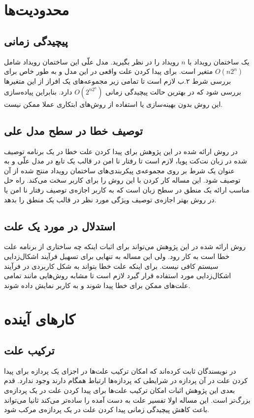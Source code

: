 \documentclass[
msc,
irfonts
]{./tex/tehran-thesis}
\newcommand{\پ}{پروژه/پایان‌نامه/رساله }
\theoremstyle{definition}
\theoremstyle{theorem}
\theoremstyle{definition}
\numberwithin{algorithm}{chapter}
\begin{document}
\section{محدودیت‌ها}
\subsection{پیچیدگی زمانی}
یک ساختمان رویداد با 
$n$
رویداد را در نظر بگیرید.
مدل علّی این ساختمان رویداد شامل 
$O(n2^n)$
متغیر است.
برای پیدا کردن علت واقعی در این مدل و به طور خاص برای بررسی شرط ۲.ب لازم است تا تمامی زیر مجموعه‌های یک افراز از این متغیر‌ها بررسی شود که در بهترین حالت پیچیدگی زمانی
$O(2^{n2^n})$
دارد.
بنابراین پیاده‌سازی این روش بدون بهینه‌سازی یا استفاده از روش‌های ابتکاری عملا ممکن نیست.
\subsection{توصیف خطا در سطح مدل علی}
در روش ارائه شده در این پژوهش برای پیدا کردن علت خطا در یک برنامه توصیف شده در زبان نت‌کت پویا، لازم است تا رفتار نا امن در قالب یک تابع در مدل علّی و به عنوان یک شرط بر روی مجموعه‌ی پیکربندی‌های ساختمان رویداد منتج شده از‌ آن توصیف شود.
این مساله کار کردن با این روش را برای کاربر سخت می‌کند. 
راه حل مناسب ارائه یک منطق در سطح زبان است که به کاربر اجازه‌ی توصیف رفتار نا امن یا در روش بهتر اجازه‌ی توصیف ویژگی مورد نظر در قالب یک منطق را بدهد.

\subsection{استدلال در مورد یک علت}
روش ارائه شده در این پژوهش می‌تواند برای اثبات اینکه چه ساختاری از برنامه علت خطا است به کار رود. 
ولی این مساله به تنهایی برای تسهیل فرآیند اشکال‌زدایی سیستم کافی نیست.
برای اینکه علت خطا بتواند به شکل کاربردی در فرآیند اشکال‌زدایی مورد استفاده قرار گیرد لازم است تا مشابه روش‌هایی مانند
\cite{chockler}
تمامی علت‌های ممکن برای خطا پیدا شوند و به کاربر نمایش داده شوند.

\section{کار‌های آینده}

\subsection{ترکیب علت}
در 
\cite{causal-hml}
نویسندگان ثابت کرده‌اند که امکان ترکیب علت‌ها در اجزای یک پردازه برای پیدا کردن علت در آن پردازه در شرایطی که پردازه‌ها ارتباط  
همگام دارند وجود ندارد.
قدم بعدی این پژوهش اثبات امکان ترکیب علت‌ها برای پیدا کردن علت در یک پردازه‌ی بزرگ‌تر است.
این مساله اولا تفسیر علت به دست آمده را ساده‌تر می‌کند ثانیا می‌تواند باعث کاهش پیچیدگی زمانی پیدا کردن علت در یک پردازه‌ی مرکب شود.
\end{document}
